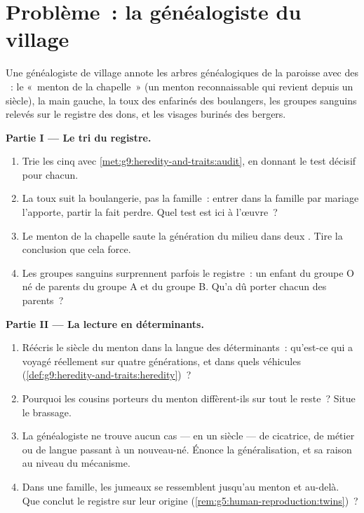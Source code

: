 \section{Problème~: la généalogiste du village}

\begin{problem}\label{pb:g9:heredity-and-traits:1}
Une généalogiste de village annote les arbres
généalogiques de la paroisse avec des ~: le
«~menton de la chapelle~» (un menton reconnaissable qui
revient depuis un siècle), la main gauche, la toux des
 enfarinés des boulangers, les groupes sanguins
relevés sur le registre des dons, et les visages burinés
des bergers.

\medskip\noindent\textbf{Partie I --- Le tri du
registre.}
\begin{enumerate}
  \item Trie les cinq  avec
        \cref{met:g9:heredity-and-traits:audit}, en
        donnant le test décisif pour chacun.
  \item La toux suit la boulangerie, pas la famille~:
        entrer dans la famille par mariage l'apporte,
        partir la fait perdre. Quel test est ici à
        l'œuvre~?
  \item Le menton de la chapelle saute la génération du
        milieu dans deux . Tire la conclusion que
        cela force.
  \item Les groupes sanguins surprennent parfois le
        registre~: un enfant du groupe O né de parents du
        groupe A et du groupe B. Qu'a dû porter chacun des
        parents~?
\end{enumerate}

\medskip\noindent\textbf{Partie II --- La lecture en
déterminants.}
\begin{enumerate}[resume]
  \item Réécris le siècle du menton dans la langue des
        déterminants~: qu'est-ce qui a voyagé réellement
        sur quatre générations, et dans quels véhicules
        (\cref{def:g9:heredity-and-traits:heredity})~?
  \item Pourquoi les cousins porteurs du menton
        diffèrent-ils sur tout le reste~? Situe le
        brassage.
  \item La généalogiste ne trouve aucun cas --- en un
        siècle --- de cicatrice, de métier ou de langue
        passant à un nouveau-né. Énonce la généralisation,
        et sa raison au niveau du mécanisme.
  \item Dans une famille, les jumeaux se ressemblent
        jusqu'au menton et au-delà. Que conclut le
        registre sur leur origine
        (\cref{rem:g5:human-reproduction:twins})~?
\end{enumerate}


\end{problem}
